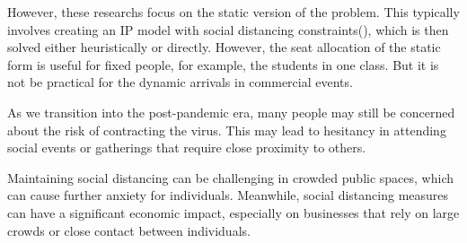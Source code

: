 





However, these researchs focus on the static version of the problem. This typically involves creating an IP model with social distancing constraints(\cite{bortolete2022support, ghorbani2020model, haque2022optimization}), which is then solved either heuristically or directly. However, the seat allocation of the static form is useful for fixed people, for example, the students in one class. 
But it is not be practical for the dynamic arrivals in commercial events.


As we transition into the post-pandemic era, many people may still be concerned about the risk of contracting the virus. This may lead to hesitancy in attending social events or gatherings that require close proximity to others.

Maintaining social distancing can be challenging in crowded public spaces, which can cause further anxiety for individuals. Meanwhile, social distancing measures can have a significant economic impact, especially on businesses that rely on large crowds or close contact between individuals.

